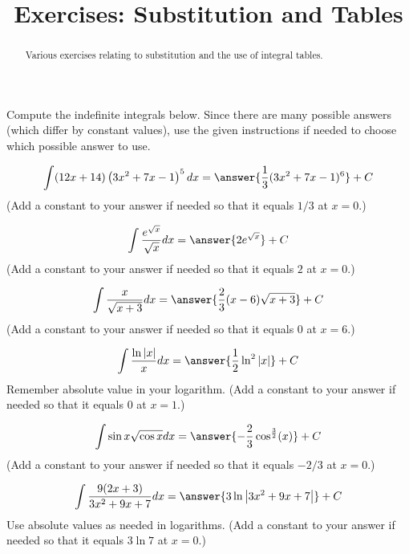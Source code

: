 \documentclass{ximera}
\title{Exercises: Substitution and Tables}
\begin{document}
\begin{abstract}
Various exercises relating to substitution and the use of integral tables.
\end{abstract}
\maketitle

Compute the indefinite integrals below. Since there are many possible answers (which differ by constant values), use the given instructions if needed to choose which possible answer to use.

\begin{exercise}%
\[ \int (12 x+14) \left(3 x^2+7 x-1\right)^5 dx = \answer{\frac{1}{3}(3 x^2+7 x-1)^6}+C \]
(Add a constant to your answer if needed so that it equals $1/3$ at $x = 0$.)
%
%
\end{exercise}

\begin{exercise}%
\[ \int \frac{e^{\sqrt{x}}}{\sqrt{x}} dx  = \answer{2 e^{\sqrt{x}}}+C \]
(Add a constant to your answer if needed so that it equals $2$ at $x = 0$.)
%
%
\end{exercise}

\begin{exercise}%
\[ \int \frac{x}{\sqrt{x+3}} dx  = \answer{\frac{2}{3} (x-6) \sqrt{x+3}}+C\]
(Add a constant to your answer if needed so that it equals $0$ at $x=6$.)
%
%
\end{exercise}

\begin{exercise}%
\[ \int \frac{\ln |x|}{x} dx  = \answer{\frac{1}{2}\ln^2 |x|}+C\]
Remember absolute value in your logarithm.
(Add a constant to your answer if needed so that it equals $0$ at $x = 1$.)
%
%
\end{exercise}

\begin{exercise}%
\[ \int \sin x \sqrt{\cos x} dx =  \answer{-\frac{2}{3} \cos ^{\frac{3}{2}}(x)}+C\]
(Add a constant to your answer if needed so that it equals $-2/3$ at $x = 0$.)
%
%
\end{exercise}

\begin{exercise}%
\[  \int \frac{9 (2 x+3)}{3 x^2+9 x+7} dx = \answer{3 \ln \left|3 x^2+9 x+7\right|}+C \]
Use absolute values as needed in logarithms. (Add a constant to your answer if needed so that it equals $3 \ln 7$ at $x = 0$.)
%
%
\end{exercise}
\end{document}
